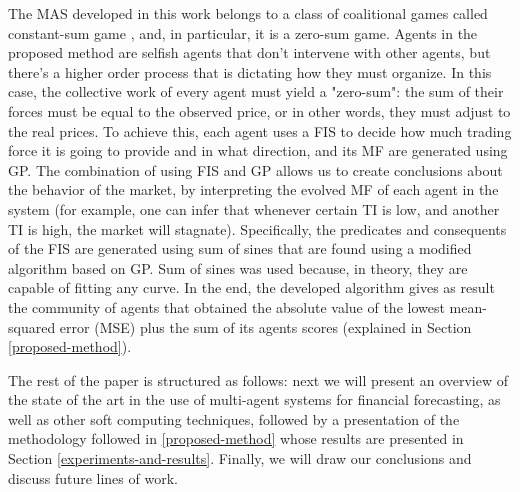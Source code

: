 \documentclass[a4paper,twoside]{article}
\begin{document}
The MAS developed in this work belongs to a class of coalitional games
called constant-sum game \cite{Shoham2009}, and, in particular, it is
a zero-sum game. Agents in the proposed method are selfish agents that
don't intervene with other agents, but there's a higher order process
that is dictating how they must organize. In this case, the collective
work of every agent must yield a "zero-sum": the sum of their forces
must be equal to the observed price, or in other words, they must
adjust to the real prices. To achieve this, each agent uses a FIS to
decide how much trading force it is going to provide and in what
direction, and its MF are generated using GP. The combination of using
FIS and GP allows us to create conclusions about the behavior of the
market, by interpreting the evolved MF of each agent in the system
(for example, one can infer that whenever certain TI is low, and
another TI is high, the market will stagnate). Specifically, the
predicates and consequents of the FIS are generated using sum of sines
that are found using a modified algorithm based on GP. Sum of sines
was used because, in theory, they are capable of fitting any curve. In
the end, the developed algorithm gives as result the community of
agents that obtained the absolute value of the lowest mean-squared
error (MSE) plus the sum of its agents scores (explained in Section
\ref{proposed-method}). 


The rest of the paper is structured as follows: next we will present
an overview of the state of the art in the use of multi-agent systems
for financial forecasting, as well as other soft computing techniques,
followed by a presentation of the methodology followed in
\ref{proposed-method} whose results are presented in Section
\ref{experiments-and-results}. Finally, we will draw our conclusions
and discuss future lines of work.
\end{document}
